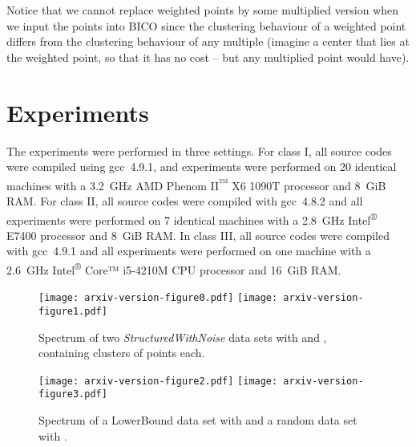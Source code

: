 \documentclass[a4paper]{scrartcl}
\begin{document}
Notice that we cannot replace weighted points by some multiplied version when we input the points into BICO since the clustering behaviour of a weighted point differs from the clustering behaviour of any multiple (imagine a center that lies at the weighted point, so that it has no cost -- but any multiplied point would have).

\section{Experiments}
The experiments were performed in three settings. For class I, all source codes were compiled using gcc~4.9.1, and experiments were performed on 20 identical machines with a 3.2~GHz AMD Phenom II\textsuperscript{™} X6 1090T processor and 8~GiB RAM.
For class II, all source codes were compiled with gcc~4.8.2 and all experiments were performed on 7 identical machines with a 2.8~GHz Intel\textsuperscript{®} E7400 processor and 8~GiB RAM.
In class III, all source codes were compiled with gcc~4.9.1 and all experiments were performed on one machine with
a 2.6~GHz Intel\textsuperscript{®} Core™ i5-4210M CPU processor and 16~GiB RAM.

\begin{figure}
\texttt{[image: arxiv-version-figure0.pdf]}
\texttt{[image: arxiv-version-figure1.pdf]}
\caption{Spectrum of two \emph{StructuredWithNoise} data sets with  and , containing  clusters of  points each.\label{spectrumswn}}
\end{figure}

\begin{figure}
\texttt{[image: arxiv-version-figure2.pdf]}
\texttt{[image: arxiv-version-figure3.pdf]}
\caption{Spectrum of a LowerBound data set with  and a random data set with .\label{spectrumlowerbound}}
\end{figure}
\end{document}
